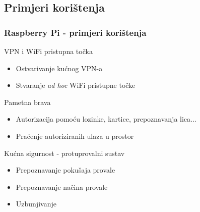 \documentclass[12pt]{beamer}
\begin{document}
\subsection{Primjeri korištenja}
\begin{frame}
	\frametitle{Raspberry Pi - primjeri korištenja}
	VPN i WiFi pristupna točka
	\begin{itemize}
		\item Ostvarivanje kućnog VPN-a
		\item Stvaranje \textit{ad hoc} WiFi pristupne točke
	\end{itemize}
	Pametna brava
	\begin{itemize}
		\item Autorizacija pomoću lozinke, kartice, prepoznavanja lica...
		\item Praćenje autoriziranih ulaza u prostor
	\end{itemize}
	\vfill
	Kućna sigurnost - protuprovalni sustav
	\begin{itemize}
		\item Prepoznavanje pokušaja provale
		\item Prepoznavanje načina provale
		\item Uzbunjivanje
	\end{itemize}
\end{frame}
\end{document}
